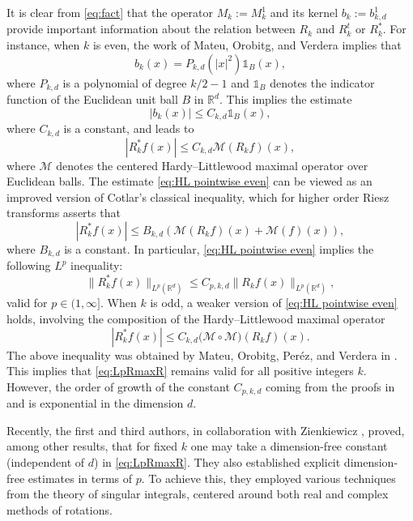 \documentclass[a4paper,12pt,reqno]{amsart}
\numberwithin{equation}{section}
\theoremstyle{definition}
\newcommand{\ind}{\mathbb{1}}
\newcommand{\R}{\mathbb{R}}
\newcommand{\mM}{\mathcal{M}}
\newcommand{\abs}[1]{\left\lvert #1 \right\rvert}
\renewcommand{\le}{\leqslant}
\begin{document}
It is clear from \eqref{eq:fact} that the operator $M_k:=M_k^1$ and its kernel $b_{k}:=b_{k,d}^1$ provide important information about the relation between $R_k$ and $R_k^t$ or $R_k^*.$ For instance, when $k$ is even,  the work of Mateu, Orobitg, and Verdera \cite[Section 2]{mov1} implies that 
\[
b_k(x)=P_{k,d}(|x|^2)\ind{_B}(x),
\]
where $P_{k,d}$ is a polynomial of degree $k/2-1$ and $\ind{_B}$ denotes the indicator function of the Euclidean unit ball $B$ in $\R^d.$ This implies the estimate
\[
\abs{b_k(x)}\le C_{k,d}\ind{_B}(x),
\]
where $C_{k,d}$ is a constant,
and leads to
\begin{equation}
\label{eq:HL pointwise even}
|R_k^*f(x)|\le C_{k,d}\mM(R_k f)(x),
\end{equation}
where $\mM$ denotes the centered Hardy--Littlewood maximal operator over Euclidean balls. The estimate \eqref{eq:HL pointwise even}  can be viewed as an improved version of Cotlar's classical inequality, which for higher order Riesz transforms asserts that
\begin{equation*}
|R_k^*f(x)|\le B_{k,d}(\mM(R_k f)(x)+ \mM(f)(x)),
\end{equation*}
where $B_{k,d}$ is a constant. In particular, \eqref{eq:HL pointwise even} implies the following $L^p$ inequality:
\begin{equation}
\label{eq:LpRmaxR}
\|R_k^*f(x)\|_{L^p(\R^d)}\le C_{p,k,d} \|R_kf(x)\|_{L^p(\R^d)},
\end{equation}
valid for $p\in (1,\infty].$ When $k$ is odd,  a weaker version of \eqref{eq:HL pointwise even} holds, involving the composition of the Hardy--Littlewood maximal operator
\begin{equation}
\label{eq:HL pointwise odd}
|R_k^*f(x)|\le C_{k,d}\mathcal (\mM\circ \mM)(R_k f)(x).
\end{equation}
The above inequality was obtained by Mateu, Orobitg, Per\'ez, and Verdera in \cite[Section 4]{mopv}. This implies that \eqref{eq:LpRmaxR} remains valid for all positive integers $k.$ However, the order of growth of the constant $C_{p,k,d}$ coming from the proofs in \cite{mov1} and \cite{mopv} is exponential in the dimension $d.$

Recently, the first and  third  authors, in collaboration with Zienkiewicz \cite{kwz}, proved, among other results, that for fixed $k$ one may take a dimension-free constant (independent of $d$) in \eqref{eq:LpRmaxR}. They also established explicit dimension-free estimates in terms of $p.$ To achieve this, they employed various techniques from the theory of singular integrals, centered around  both real and complex methods of rotations.
\end{document}
